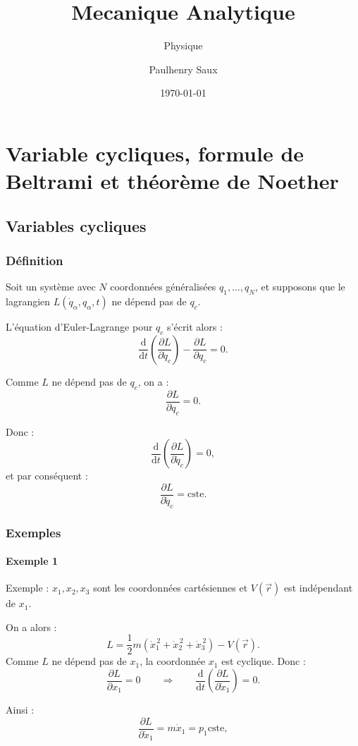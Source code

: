 \documentclass[french]{yLectureNote}
\title{Mecanique Analytique}
\subtitle{Physique}
\author{Paulhenry Saux}
\date{\today}
\renewcommand{\vec}{\overrightarrow}
\newcommand{\dd}{\mathrm{d}}
\begin{document}
\chapter{Variable cycliques, formule de Beltrami et théorème de Noether}
\section{Variables cycliques}
\subsection{Définition}
Soit un système avec $N$ coordonnées généralisées $q_1,\dots,q_N$, et supposons que le lagrangien
$L(\dot{q}_\alpha,q_\alpha,t)$ ne dépend pas de $q_c$.

L'équation d'Euler-Lagrange pour $q_c$ s'écrit alors :
\[
\frac{\dd}{\dd t}\left(\frac{\partial L}{\partial \dot{q}_c}\right)
-
\frac{\partial L}{\partial q_c}
= 0.
\]

Comme $L$ ne dépend pas de $q_c$, on a :
\[
\frac{\partial L}{\partial q_c}=0.
\]

Donc :
\[
\frac{\dd}{\dd t}\left(\frac{\partial L}{\partial \dot{q}_c}\right)=0,
\]
et par conséquent :
\[
\frac{\partial L}{\partial \dot{q}_c}=\text{cste}.
\]
\subsection{Exemples}
\subsubsection{Exemple 1}
Exemple : $x_1, x_2, x_3$ sont les coordonnées cartésiennes et $V(\vec{r})$ est indépendant de $x_1$.

On a alors :
\[
L=\frac{1}{2}m\left(\dot{x}_1^{\,2}+\dot{x}_2^{\,2}+\dot{x}_3^{\,2}\right)-V(\vec{r}).
\]
Comme $L$ ne dépend pas de $x_1$, la coordonnée $x_1$ est cyclique. Donc :
\[
\frac{\partial L}{\partial x_1}=0
\qquad \Rightarrow \qquad
\frac{\dd}{\dd t}\left(\frac{\partial L}{\partial \dot{x}_1}\right)=0.
\]

Ainsi :
\[
\frac{\partial L}{\partial \dot{x}_1}=m\dot{x}_1= p_1\text{cste},
\]
\end{document}
